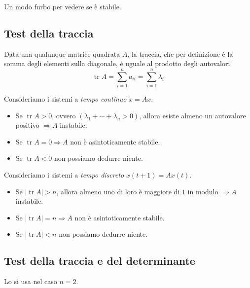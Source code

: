 \documentclass[10pt,a4paper]{book}
\DeclareMathOperator{\tr}{tr}
\begin{document}
Un modo furbo per vedere se è stabile.
\subsection{Test della traccia}
\begin{ricalg}
	Data una qualunque matrice quadrata $A$, la traccia, che per definizione è la somma degli elementi sulla diagonale, è uguale al prodotto degli autovalori
	\begin{equation*}
		\tr A=\sum\limits ^n_{i=1} a_{ii} =\sum\limits ^n_{i=1} \lambda _i
	\end{equation*}
\end{ricalg}

Consideriamo i sistemi a \textit{tempo continuo} $\dot{x} =Ax$.
\begin{itemize}
	\item Se $\tr A >0$, ovvero $\left(\lambda _1 +\cdots +\lambda _n  >0\right)$, allora esiste almeno un autovalore positivo $\Rightarrow A$ instabile.
	\item Se $\tr A=0\Rightarrow A$ non è asintoticamente stabile.
	\item Se $\tr A< 0$ non possiamo dedurre niente.
\end{itemize}

Consideriamo i sistemi a \textit{tempo discreto} $x\left(t+1\right) =Ax\left(t\right)$.
\begin{itemize}
	\item Se $\left| \tr A\right|  >n$, allora almeno uno di loro è maggiore di $1$ in modulo $\Rightarrow A$ instabile.
	\item Se $\left| \tr A\right| =n\Rightarrow A$ non è asintoticamente stabile.
	\item Se $\left| \tr A\right| < n$ non possiamo dedurre niente.
\end{itemize}
\subsection{Test della traccia e del determinante}

Lo si usa nel caso $n=2$.
\end{document}
